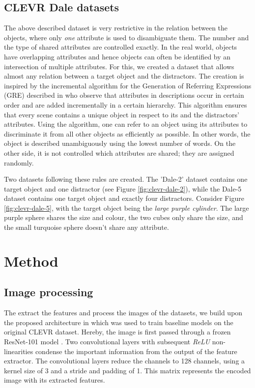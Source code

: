 \documentclass[11pt]{article}
\begin{document}
\subsection{CLEVR Dale datasets}
The above described dataset is very restrictive in the relation between the objects, where only \emph{one} attribute is used to disambiguate them.
The number and the type of shared attributes are controlled exactly.
In the real world, objects have overlapping attributes and hence objects can often be identified by an intersection of multiple attributes.
For this, we created a dataset that allows almost any relation between a target object and the distractors.
The creation is inspired by the incremental algorithm for the Generation of Referring Expressions (GRE) described in \citep{Dale1995} who observe that attributes in descriptions occur in certain order and are added incrementally in a certain hierarchy.
This algorithm ensures that every scene contains a unique object in respect to its and the distractors' attributes.
Using the algorithm, one can refer to an object using its attributes to discriminate it from all other objects as efficiently as possible.
In other words, the object is described unambiguously using the lowest number of words.
On the other side, it is not controlled which attributes are shared; they are assigned randomly.

Two datasets following these rules are created.
The 'Dale-2' dataset contains one target object and one distractor (see Figure \ref{fig:clevr-dale-2}), while the Dale-5 dataset contains one target object and exactly four distractors.
Consider Figure \ref{fig:clevr-dale-5}, with the target object being the \emph{large purple cylinder}. The large purple sphere shares the size and colour, the two cubes only share the size, and the small turquoise sphere doesn't share any attribute.

\section{Method}
\subsection{Image processing}
\label{sec:image-processing}
The extract the features and process the images of the datasets, we build upon the proposed architecture in \citet{Johnson2017} which was used to train baseline models on the original CLEVR dataset.
Hereby, the image is first passed through a frozen ResNet-101 model \citep{He2016}.
Two convolutional layers with subsequent \emph{ReLU} non-linearities condense the important information from the output of the feature extractor.
The convolutional layers reduce the channels to 128 channels, using a kernel size of 3 and a stride and padding of 1.
This matrix represents the encoded image with its extracted features.
\end{document}
